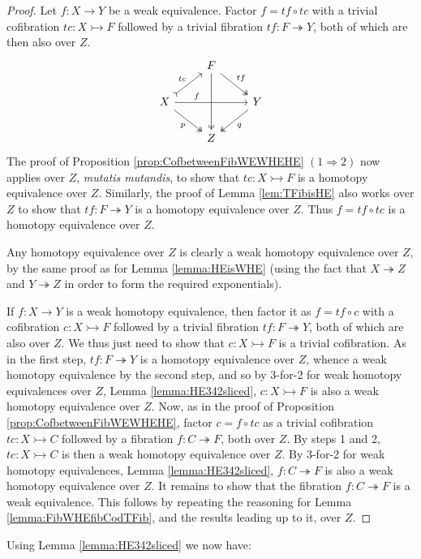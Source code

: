 \documentclass[11pt,reqno]{amsart}
\newcommand{\cof}{\ensuremath{\rightarrowtail}}
\newcommand{\fib}{\ensuremath{\twoheadrightarrow}}
\renewcommand{\to}{\ensuremath{\rightarrow}}
\theoremstyle{remark}
\theoremstyle{definition}
\begin{document}
\begin{proof}
Let $f : X\to Y$ be a weak equivalence.  Factor $f = tf\circ tc$ with a trivial cofibration $tc : X \cof F$ followed by a trivial fibration $tf : F \fib Y$, both of which are then also over $Z$.  
\[\begin{tikzcd}
	& F  \ar[dd, two heads]  \ar[dr, two heads, "tf"]  &  \\  
X  \ar[ur, tail, "tc"]  \ar[dr, two heads, swap, "p"] \ar[rr, pos=0.3, "f"] & & Y \ar[dl, two heads, "q" ]   \\
 & Z & 
 \end{tikzcd}\]
The proof of Proposition \ref{prop:CofbetweenFibWEWHEHE} $(1\!\Rightarrow\!2)$ now applies over $Z$, \emph{mutatis mutandis},  to show that $tc : X\cof F$ is a homotopy equivalence over $Z$. Similarly, the proof of Lemma \ref{lem:TFibisHE} also works over $Z$ to show that $tf: F\fib Y$ is a homotopy equivalence over $Z$. Thus $f = tf\circ tc$ is a homotopy equivalence over $Z$.

Any homotopy equivalence over $Z$ is clearly a weak homotopy equivalence over $Z$, by the same proof as for Lemma \ref{lemma:HEisWHE} (using the fact that $X\fib Z$ and $Y\fib Z$ in order to form the required exponentials).

If $f : X\to Y$ is a weak homotopy equivalence, then factor it as $f = tf\circ c$ with a cofibration $c : X \cof F$ followed by a trivial fibration $tf : F \fib Y$, both of which are also over $Z$.   We thus just need to show that $c : X \cof F$ is a trivial cofibration.  As in the first step, $tf : F \fib Y$ is a homotopy equivalence over $Z$, whence a weak homotopy equivalence by the second step, and so by 3-for-2 for weak homotopy equivalences over $Z$, Lemma \ref{lemma:HE342sliced}, $c : X \cof F$ is also a weak homotopy equivalence over $Z$.  Now, as in the proof of Proposition \ref{prop:CofbetweenFibWEWHEHE}, factor $c = f\circ tc$ as a trivial cofibration $tc : X \cof C$ followed by a fibration $f : C \fib F$, both over $Z$.   By steps 1 and 2, $tc : X \cof C$ is then a weak homotopy equivalence over $Z$. By 3-for-2 for weak homotopy equivalences, Lemma \ref{lemma:HE342sliced}, $f : C \fib F$ is also a weak homotopy equivalence over $Z$.  It remains to show that the fibration $f : C \fib F$ is a weak equivalence.  This follows by repeating the reasoning for Lemma \ref{lemma:FibWHEfibCodTFib}, and the results leading up to it, over $Z$.
\end{proof}

Using Lemma \ref{lemma:HE342sliced} we now have:
\end{document}
